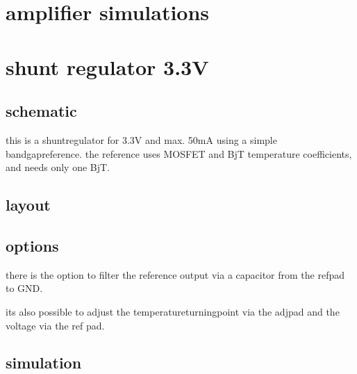 \documentclass[letterpaper,10pt,english]{sphinxmanual}
\begin{document}
\chapter{amplifier simulations}
\label{\detokenize{amplifiers:amplifier-simulations}}
\sphinxAtStartPar
{}

\sphinxstepscope


\chapter{shunt regulator 3.3V}
\label{\detokenize{regulator:shunt-regulator-3-3v}}\label{\detokenize{regulator::doc}}

\section{schematic}
\label{\detokenize{regulator:schematic}}

\sphinxAtStartPar
this is a shunt\sphinxhyphen{}regulator for 3.3V and max. 50mA using a simple band\sphinxhyphen{}gap\sphinxhyphen{}reference. the reference uses MOSFET and BjT temperature coefficients, and needs only one BjT.


\section{layout}
\label{\detokenize{regulator:layout}}


\section{options}
\label{\detokenize{regulator:options}}
\sphinxAtStartPar
there is the option to filter the reference output via a capacitor from the ref\sphinxhyphen{}pad to GND.

\sphinxAtStartPar
its also possible to adjust the temperature\sphinxhyphen{}turning\sphinxhyphen{}point via the adj\sphinxhyphen{}pad and the voltage via the ref pad.


\section{simulation}
\label{\detokenize{regulator:simulation}}
\sphinxAtStartPar
{}
\end{document}
